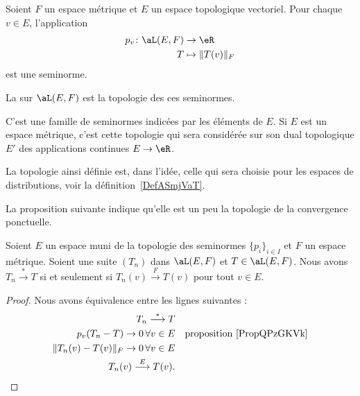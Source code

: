 \begin{lemmaDef}  \label{DefHUelCDD}
	Soient \( F\) un espace métrique et \( E\) un espace topologique vectoriel. Pour chaque \( v\in E\), l'application
	\begin{equation}
		\begin{aligned}
			p_v\colon \aL(E,F) & \to \eR              \\
			T                  & \mapsto \| T(v) \|_F
		\end{aligned}
	\end{equation}
	est une seminorme.

	La  sur \( \aL(E,F)\) est la topologie des ces seminormes.
\end{lemmaDef}

\begin{normaltext}
	C'est une famille de seminormes indicées par les éléments de \( E\). Si \( E\) est un espace métrique, c'est cette topologie qui sera considérée sur son dual topologique \( E'\) des applications continues \( E\to \eR\).

	La topologie ainsi définie est,  dans l'idée, celle qui sera choisie pour les espaces de distributions, voir la définition~\ref{DefASmjVaT}.
\end{normaltext}

La proposition suivante indique qu'elle est un peu la topologie de la convergence ponctuelle.
\begin{proposition}     \label{PROPooQWOOooUBhBiG}
	Soient \( E\) un espace muni de la topologie des seminormes \( \{ p_i \}_{i\in I}\) et \( F\) un espace métrique. Soient une suite \( (T_n)\) dans \( \aL(E,F)\) et \( T\in \aL(E,F)\). Nous avons \( T_n\stackrel{*}{\longrightarrow}T\) si et seulement si \( T_n(v)\stackrel{F}{\longrightarrow}T(v)\) pour tout \( v\in E\).
\end{proposition}

\begin{proof}
	Nous avons équivalence entre les lignes suivantes :
	\begin{subequations}
		\begin{align}
			T_n\stackrel{*}{\longrightarrow}T                                         \\
			p_v(T_n-T)\to 0\,\forall v\in E &  & \text{proposition~\ref{PropQPzGKVk}} \\
			\| T_n(v)-T(v) \|_F\to 0\,\forall v\in E                                  \\
			T_n(v)\stackrel{E}{\longrightarrow}T(v).
		\end{align}
	\end{subequations}
\end{proof}

